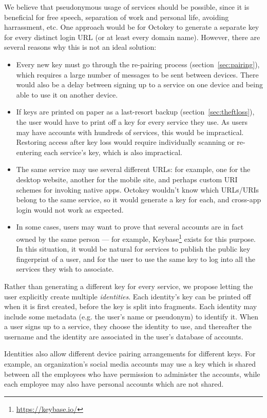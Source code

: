 We believe that pseudonymous usage of services should be possible, since it is beneficial for free
speech, separation of work and personal life, avoiding harrassment, etc. One approach would be for
Octokey to generate a separate key for every distinct login URL (or at least every domain name).
However, there are several reasons why this is not an ideal solution:
\begin{itemize}
\item Every new key must go through the re-pairing process (section~\ref{sec:pairing}), which
requires a large number of messages to be sent between devices. There would also be a delay between
signing up to a service on one device and being able to use it on another device.
\item If keys are printed on paper as a last-resort backup (section~\ref{sec:theftloss}), the user
would have to print off a key for every service they use. As users may have accounts with hundreds
of services, this would be impractical. Restoring access after key loss would require individually
scanning or re-entering each service's key, which is also impractical.
\item The same service may use several different URLs: for example, one for the desktop website,
another for the mobile site, and perhaps custom URI schemes for invoking native apps. Octokey
wouldn't know which URLs/URIs belong to the same service, so it would generate a key for each, and
cross-app login would not work as expected.
\item In some cases, users may want to prove that several accounts are in fact owned by the same
person --- for example, Keybase\footnote{\url{https://keybase.io/}} exists for this purpose. In this
situation, it would be natural for services to publish the public key fingerprint of a user, and for
the user to use the same key to log into all the services they wish to associate.
\end{itemize}

Rather than generating a different key for every service, we propose letting the user explicitly
create multiple \emph{identities}. Each identity's key can be printed off when it is first created,
before the key is split into fragments. Each identity may include some metadata (e.g. the user's
name or pseudonym) to identify it. When a user signs up to a service, they choose the identity to
use, and thereafter the username and the identity are associated in the user's database of accounts.

Identities also allow different device pairing arrangements for different keys. For example, an
organization's social media accounts may use a key which is shared between all the employees who
have permission to administer the accounts, while each employee may also have personal accounts
which are not shared.

